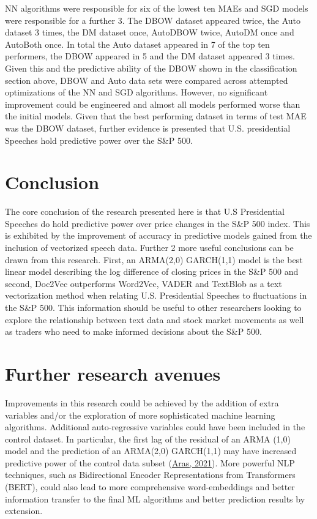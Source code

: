 \documentclass[11pt,preprint, authoryear]{elsarticle}
\numberwithin{equation}{section}
\numberwithin{figure}{section}
\numberwithin{table}{section}
\begin{document}
NN algorithms were responsible for six of the lowest ten MAEs and SGD
models were responsible for a further 3. The DBOW dataset appeared
twice, the Auto dataset 3 times, the DM dataset once, AutoDBOW twice,
AutoDM once and AutoBoth once. In total the Auto dataset appeared in 7
of the top ten performers, the DBOW appeared in 5 and the DM dataset
appeared 3 times. Given this and the predictive ability of the DBOW
shown in the classification section above, DBOW and Auto data sets were
compared across attempted optimizations of the NN and SGD algorithms.
However, no significant improvement could be engineered and almost all
models performed worse than the initial models. Given that the best
performing dataset in terms of test MAE was the DBOW dataset, further
evidence is presented that U.S. presidential Speeches hold predictive
power over the S\&P 500.

\hypertarget{conclusion}{%
\section{Conclusion}\label{conclusion}}

The core conclusion of the research presented here is that U.S
Presidential Speeches do hold predictive power over price changes in the
S\&P 500 index. This is exhibited by the improvement of accuracy in
predictive models gained from the inclusion of vectorized speech data.
Further 2 more useful conclusions can be drawn from this research.
First, an ARMA(2,0) GARCH(1,1) model is the best linear model describing
the log difference of closing prices in the S\&P 500 and second, Doc2Vec
outperforms Word2Vec, VADER and TextBlob as a text vectorization method
when relating U.S. Presidential Speeches to fluctuations in the S\&P
500. This information should be useful to other researchers looking to
explore the relationship between text data and stock market movements as
well as traders who need to make informed decisions about the S\&P 500.

\hypertarget{further-research-avenues}{%
\section{Further research avenues}\label{further-research-avenues}}

Improvements in this research could be achieved by the addition of extra
variables and/or the exploration of more sophisticated machine learning
algorithms. Additional auto-regressive variables could have been
included in the control dataset. In particular, the first lag of the
residual of an ARMA (1,0) model and the prediction of an ARMA(2,0)
GARCH(1,1) may have increased predictive power of the control data
subset (\protect\hyperlink{ref-aras2021stacking}{Aras, 2021}). More
powerful NLP techniques, such as Bidirectional Encoder Representations
from Transformers (BERT), could also lead to more comprehensive
word-embeddings and better information transfer to the final ML
algorithms and better prediction results by extension.
\end{document}
